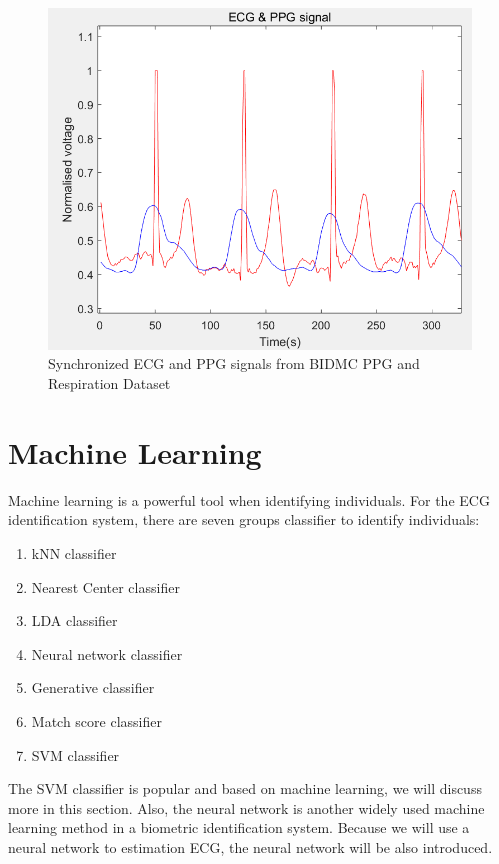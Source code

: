 \documentclass[a4paper,12pt]{article}
\begin{document}
\begin{figure}[H]
\centering
\includegraphics[width = .8\textwidth]{ecg_ppg.PNG}
\caption{Synchronized ECG and PPG signals from BIDMC PPG and Respiration Dataset\autocite{PhysioNet}}
\label{fig:ppg_ecg}
\end{figure}

\section{Machine Learning}
Machine learning is a powerful tool when identifying individuals. For the ECG identification system, there are seven groups classifier to identify individuals:
\begin{enumerate}
    \item kNN classifier
    \item Nearest Center classifier
    \item LDA classifier
    \item Neural network classifier
    \item Generative classifier
    \item Match score classifier
    \item SVM classifier
\end{enumerate}
The SVM classifier is popular and based on machine learning, we will discuss more in this section. Also, the neural network is another widely used machine learning method in a biometric identification system. Because we will use a neural network to estimation ECG, the neural network will be also introduced.
\end{document}
